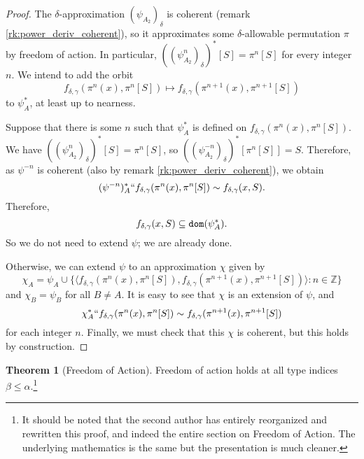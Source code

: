 \documentclass{article}
\theoremstyle{definition}
\newtheorem{theorem}{Theorem}[section]
\theoremstyle{remark}
\begin{document}
\begin{proof}
  The $\delta$-approximation $(\psi_{A_2})_\delta$ is coherent (remark \ref{rk:power_deriv_coherent}), so it approximates some $\delta$-allowable permutation $\pi$ by freedom of action.
  In particular, $((\psi_{A_2}^n)_\delta)^*[S] = \pi^n[S]$ for every integer $n$.
  We intend to add the orbit
  $$ f_{\delta,\gamma}(\pi^n(x), \pi^n[S]) \mapsto f_{\delta,\gamma}(\pi^{n+1}(x), \pi^{n+1}[S]) $$
  to $\psi_A^*$, at least up to nearness.

  Suppose that there is some $n$ such that $\psi_A^*$ is defined on $f_{\delta,\gamma}(\pi^n(x), \pi^n[S])$.
  We have $((\psi_{A_2}^n)_\delta)^*[S] = \pi^n[S]$, so $((\psi_{A_2}^{-n})_\delta)^*[\pi^n[S]] = S$.
  Therefore, as $\psi^{-n}$ is coherent (also by remark \ref{rk:power_deriv_coherent}), we obtain
  $$ (\psi^{-n})_A^* `` f_{\delta,\gamma}(\pi^n(x), \pi^n[S]) \sim f_{\delta,\gamma}(x, S). $$
  Therefore,
  $$ f_{\delta,\gamma}(x, S) \subseteq {\tt dom}(\psi_A^*).$$
  So we do not need to extend $\psi$; we are already done.

  Otherwise, we can extend $\psi$ to an approximation $\chi$ given by
  \[ \chi_A = \psi_A \cup \{ \langle f_{\delta,\gamma}(\pi^n(x), \pi^n[S]), f_{\delta,\gamma}(\pi^{n+1}(x), \pi^{n+1}[S]) \rangle : n \in \mathbb Z \} \]
  and \( \chi_B = \psi_B \) for all \( B \neq A \).
  It is easy to see that \( \chi \) is an extension of \( \psi \), and
  $$ \chi_A^* `` f_{\delta,\gamma}(\pi^n(x), \pi^n[S]) \sim f_{\delta,\gamma}(\pi^{n+1}(x), \pi^{n+1}[S]) $$
  for each integer $n$.
  Finally, we must check that this $\chi$ is coherent, but this holds by construction.
\end{proof}
\begin{theorem}[Freedom of Action]\label{thm:foa}
  Freedom of action holds at all type indices $\beta \leq \alpha$.\footnote{It should be noted that the second author has entirely reorganized and rewritten this proof, and indeed the entire section on Freedom of Action.  The underlying mathematics is the same but the presentation is much cleaner.}
\end{theorem}
\end{document}
